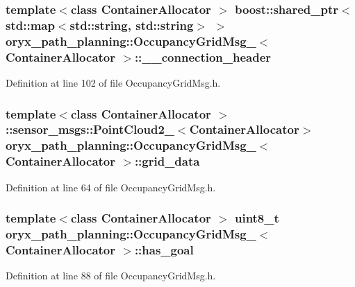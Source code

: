 \subsubsection[{\-\_\-\-\_\-connection\-\_\-header}]{\setlength{\rightskip}{0pt plus 5cm}template$<$class Container\-Allocator $>$ boost\-::shared\-\_\-ptr$<$std\-::map$<$std\-::string, std\-::string$>$ $>$ {\bf oryx\-\_\-path\-\_\-planning\-::\-Occupancy\-Grid\-Msg\-\_\-}$<$ \-Container\-Allocator $>$\-::{\bf \-\_\-\-\_\-connection\-\_\-header}}\label{structoryx__path__planning_1_1OccupancyGridMsg___afd306f99297a8190a4e773ad116d6e13}


\-Definition at line 102 of file \-Occupancy\-Grid\-Msg.\-h.

\subsubsection[{grid\-\_\-data}]{\setlength{\rightskip}{0pt plus 5cm}template$<$class Container\-Allocator $>$ \-::sensor\-\_\-msgs\-::\-Point\-Cloud2\-\_\-$<$\-Container\-Allocator$>$ {\bf oryx\-\_\-path\-\_\-planning\-::\-Occupancy\-Grid\-Msg\-\_\-}$<$ \-Container\-Allocator $>$\-::{\bf grid\-\_\-data}}\label{structoryx__path__planning_1_1OccupancyGridMsg___afa73abe77df0b705ecdf94d1ac9c4cf5}


\-Definition at line 64 of file \-Occupancy\-Grid\-Msg.\-h.

\subsubsection[{has\-\_\-goal}]{\setlength{\rightskip}{0pt plus 5cm}template$<$class Container\-Allocator $>$ uint8\-\_\-t {\bf oryx\-\_\-path\-\_\-planning\-::\-Occupancy\-Grid\-Msg\-\_\-}$<$ \-Container\-Allocator $>$\-::{\bf has\-\_\-goal}}\label{structoryx__path__planning_1_1OccupancyGridMsg___a6b9bfc8df2c1d4a92bd8beb94645ccea}


\-Definition at line 88 of file \-Occupancy\-Grid\-Msg.\-h.

